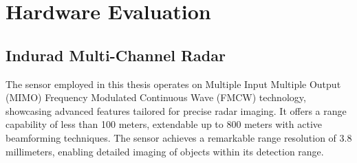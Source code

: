 \chapter{Hardware Evaluation}






\section{Indurad Multi-Channel Radar}

The sensor employed in this thesis operates on Multiple Input Multiple Output (MIMO) Frequency Modulated Continuous Wave (FMCW) technology,
showcasing advanced features tailored for precise radar imaging.
It offers a range capability of less than 100 meters, extendable up to 800 meters with active beamforming techniques.
The sensor achieves a remarkable range resolution of 3.8 millimeters, enabling detailed imaging of objects within its detection range.

